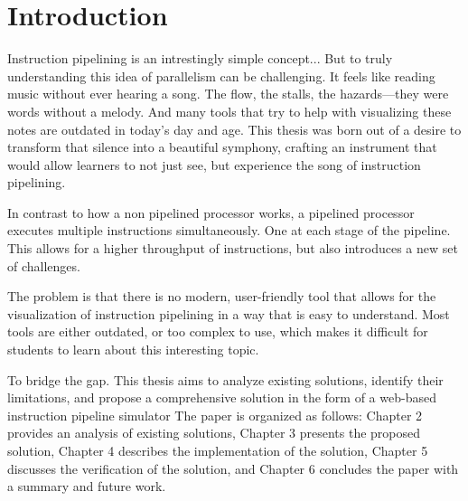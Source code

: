 \chapter{Introduction}


Instruction pipelining is an intrestingly simple concept... But to truly understanding this idea of parallelism can be challenging. It feels like reading music without ever hearing a song. The flow, the stalls, the hazards—they were words without a melody. And many tools that try to help with visualizing these notes are outdated in today's day and age.
This thesis was born out of a desire to transform that silence into a beautiful symphony, crafting an instrument that would allow learners to not just see, but experience the song of instruction pipelining.

In contrast to how a non pipelined processor works, a pipelined processor executes multiple instructions simultaneously. One at each stage of the pipeline. This allows for a higher throughput of instructions, but also introduces a new set of challenges.

The problem is that there is no modern, user-friendly tool that allows for the visualization of instruction pipelining in a way that is easy to understand. Most tools are either outdated, or too complex to use, which makes it difficult for students to learn about this interesting topic.

To bridge the gap. This thesis aims to analyze existing solutions, identify their limitations, and propose a comprehensive solution in the form of a web-based instruction pipeline simulator
The paper is organized as follows: Chapter 2 provides an analysis of existing solutions, Chapter 3 presents the proposed solution, Chapter 4 describes the implementation of the solution, Chapter 5 discusses the verification of the solution, and Chapter 6 concludes the paper with a summary and future work.


